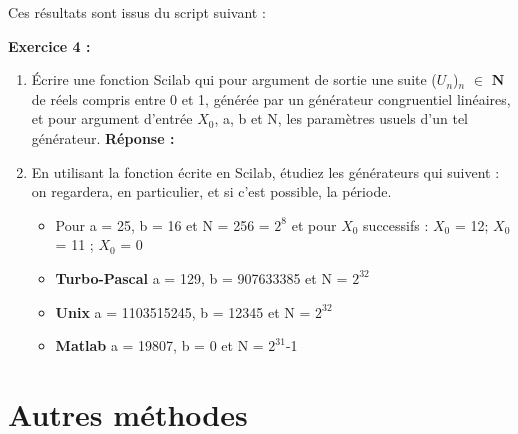 \documentclass[oneside]{book}
\begin{document}
Ces résultats sont issus du script suivant :

\newpage
\textbf{Exercice 4 :}
\begin{enumerate}
	\item Écrire une fonction Scilab qui pour argument de sortie une suite ($U_{n}$)$_{n}$ $\in$ $\mathbf{N}$ de réels compris entre 0 et 1, générée par un générateur congruentiel linéaires, et pour argument d'entrée $X_0$, a, b et N, les paramètres usuels d'un tel générateur.\newline
\textbf{Réponse :} 

	\item En utilisant la fonction écrite en Scilab, étudiez les générateurs qui suivent : on regardera, en particulier, et si c'est possible, la période.
	\begin{itemize}
		\item Pour a = 25, b = 16 et N = 256 = $2^8$ et pour $X_0$ successifs : $X_0$ = 12; $X_0$ = 11 ; $X_0$ = 0
		\item \textbf{Turbo-Pascal} a = 129, b = 907633385 et N = $2^{32}$
		\item \textbf{Unix} a = 1103515245, b = 12345 et N = $2^{32}$
		\item \textbf{Matlab} a = 19807, b = 0 et N = $2^{31}$-1
	\end{itemize}
\end{enumerate}
\section{Autres méthodes}
\end{document}

